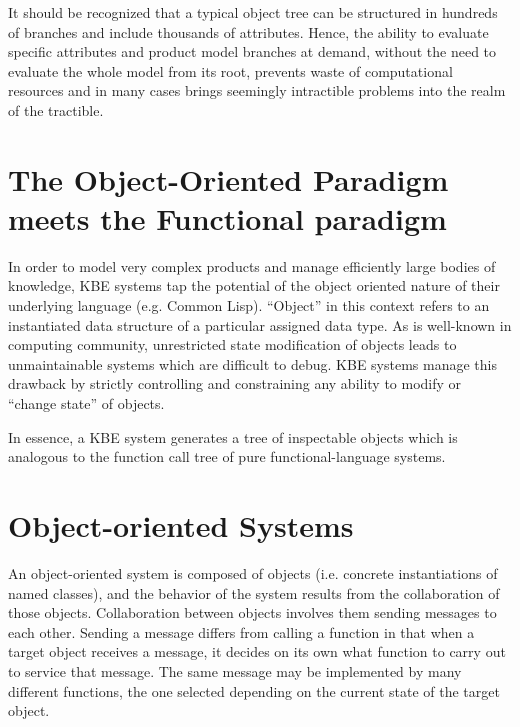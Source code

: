 \documentclass [11pt]{book}
\begin{document}
It should be recognized that a typical object tree can be structured
in hundreds of branches and include thousands of attributes. Hence,
the ability to evaluate specific attributes and product model branches
at demand, without the need to evaluate the whole model from its root,
prevents waste of computational resources and in many cases brings
seemingly intractible problems into the realm of the tractible.

\section{The Object-Oriented Paradigm meets the Functional paradigm}

\label{sec:theobject-orientedparadigmmeetsthefunctionalparadigm}

In order to model very complex products and manage efficiently
large bodies of knowledge, KBE systems tap the potential of the object
oriented nature of their underlying language (e.g. Common
Lisp). ``Object'' in this context refers to an instantiated data
structure of a particular assigned data type. As is well-known in
computing community, unrestricted state modification of objects leads
to unmaintainable systems which are difficult to debug. KBE systems
manage this drawback by strictly controlling and constraining
any ability to modify or ``change state'' of objects. 

In essence, a KBE system generates a tree of inspectable objects which
is analogous to the function call tree of pure functional-language
systems.

\section{Object-oriented Systems}

\label{sec:object-orientedsystems}

An object-oriented system is composed of
       objects (i.e. concrete instantiations of named classes), and
       the behavior of the system results from the collaboration of
       those objects. Collaboration between objects involves them
       sending messages to each other. Sending a message differs from
       calling a function in that when a target object receives a
       message, it decides on its own what function to carry out to
       service that message. The same message may be implemented by
       many different functions, the one selected depending on the
       current state of the target object.
\end{document}
